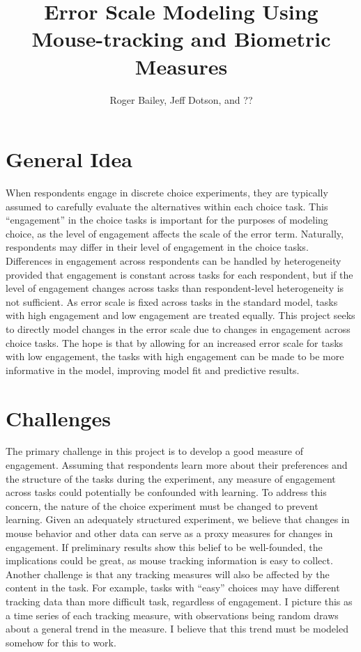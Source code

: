\documentclass[12pt]{article}
\title{Error Scale Modeling Using Mouse-tracking and Biometric Measures}
\author{Roger Bailey, Jeff Dotson, and ??}
\begin{document}
 \maketitle \normalsize


\section{General Idea}
When respondents engage in discrete choice experiments, they are typically assumed to carefully evaluate the alternatives within each choice task.  This ``engagement'' in the choice tasks is important for the purposes of modeling choice, as the level of engagement affects the scale of the error term.  Naturally, respondents may differ in their level of engagement in the choice tasks.  Differences in engagement across respondents can be handled by heterogeneity provided that engagement is constant across tasks for each respondent, but if the level of engagement changes across tasks than respondent-level heterogeneity is not sufficient.   As error scale is fixed across tasks in the standard model, tasks with high engagement and low engagement are treated equally. This project seeks to directly model changes in the error scale due to changes in engagement across choice tasks. The hope is that by allowing for an increased error scale for tasks with low engagement, the tasks with high engagement can be made to be more informative in the model, improving model fit and predictive results.  \\

\section{Challenges}
The primary challenge in this project is to develop a good measure of engagement.  Assuming that respondents learn more about their preferences and the structure of the tasks during the experiment, any measure of engagement across tasks could potentially be confounded with learning.  To address this concern, the nature of the choice experiment must be changed to prevent learning.  Given an adequately structured experiment, we believe that changes in mouse behavior and other data can serve as a proxy measures for changes in engagement.  If preliminary results show this belief to be well-founded, the implications could be great, as mouse tracking information is easy to collect.\\

Another challenge is that any tracking measures will also be affected by the content in the task.  For example, tasks with ``easy'' choices may have different tracking data than more difficult task, regardless of engagement.  I picture this as a time series of each tracking measure, with observations being random draws about a general trend in the measure.  I believe that this trend must be modeled somehow for this to work.\\
\end{document}

